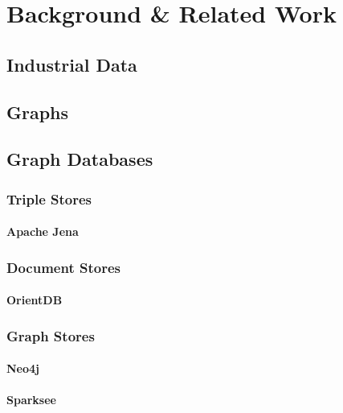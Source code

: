 \chapter{Background \& Related Work}
\label{ch:background}

\section{Industrial Data}
\label{ch:background:se:industrialData}

\section{Graphs}

\section{Graph Databases}
\label{ch:background:se:graphDatabases}

\subsection{Triple Stores}

\subsubsection{Apache Jena}

\subsection{Document Stores}

\subsubsection{OrientDB}

\subsection{Graph Stores}

\subsubsection{Neo4j}

\subsubsection{Sparksee}


